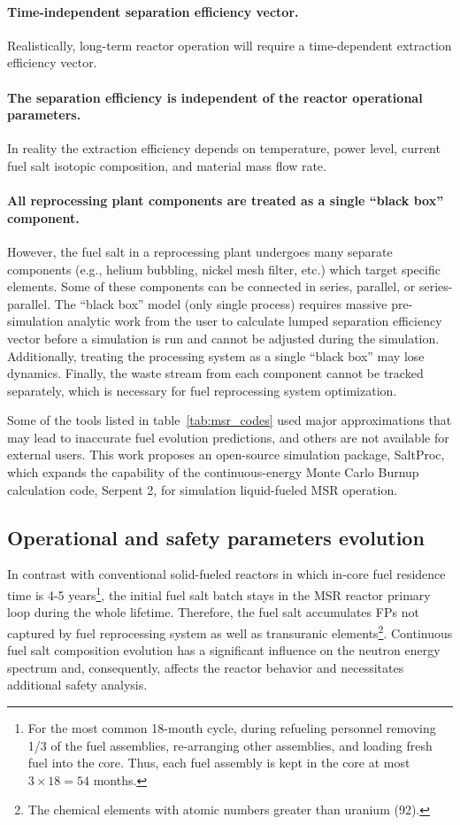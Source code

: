 \paragraph{Time-independent separation efficiency vector.} Realistically, 
	long-term reactor operation will require a time-dependent extraction 
	efficiency vector.
\paragraph{The separation efficiency is independent of the reactor operational 
	parameters.} In reality the extraction efficiency depends on temperature, 
	power level, current fuel salt isotopic composition, and material mass 
	flow rate.
\paragraph{All reprocessing plant components are treated as a single ``black 
box'' component.} However, the fuel salt in a reprocessing plant undergoes 
many separate components (e.g., helium bubbling, nickel mesh filter, etc.) 
which target specific elements. Some of these components can be connected in 
series, parallel, or series-parallel. The ``black box'' model (only single 
process) requires massive pre-simulation analytic work from the user to 
calculate lumped separation efficiency vector before a simulation is run and 
cannot be adjusted during the simulation. Additionally, treating the 
processing system as a single ``black box'' may lose dynamics. Finally, the 
waste stream from each component cannot be tracked separately, which is 
necessary for fuel reprocessing system optimization.

Some of the tools listed in table~\ref{tab:msr_codes} used major 
approximations that may lead to inaccurate fuel evolution predictions, and 
others are not available for external users. This work proposes an open-source 
simulation package, SaltProc, which expands the capability of the 
continuous-energy Monte Carlo Burnup calculation code, Serpent 2, for 
simulation liquid-fueled \gls{MSR} operation.

\subsection{Operational and safety parameters evolution} 
\label{sec:saf-par-literature}
In contrast with conventional solid-fueled reactors in which in-core fuel 
residence time is 4-5 years\footnote{For the most common 
18-month cycle, during refueling personnel removing 1/3 of the fuel 
assemblies, re-arranging other assemblies, and loading fresh fuel into the 
core. Thus, each fuel assembly is kept in the core at most $3\times 18=54$ 
months.}, the initial fuel salt batch stays in the \gls{MSR} reactor primary 
loop during the whole lifetime. Therefore, the fuel salt accumulates 
\glspl{FP} not captured by fuel reprocessing system as well as transuranic 
elements\footnote{The chemical elements with atomic numbers greater than 
uranium (92).}. Continuous fuel salt composition evolution has a 
significant influence on the neutron energy spectrum and, consequently, 
affects the reactor behavior and necessitates additional safety analysis.

